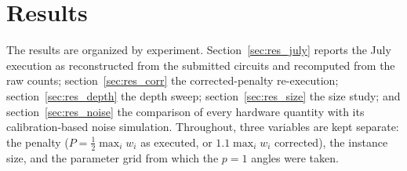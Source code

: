 \documentclass{iopjournal}
\begin{document}
\begin{table}[htbp]
\medskip
{}
\end{table}

\section{Results}
\label{sec:results}


The results are organized by experiment. Section~\ref{sec:res_july} reports the July execution as reconstructed from the submitted circuits and recomputed from the raw counts; section~\ref{sec:res_corr} the corrected-penalty re-execution; section~\ref{sec:res_depth} the depth sweep; section~\ref{sec:res_size} the size study; and section~\ref{sec:res_noise} the comparison of every hardware quantity with its calibration-based noise simulation. Throughout, three variables are kept separate: the penalty ($P = \tfrac{1}{2}\max_i w_i$ as executed, or $1.1\max_i w_i$ corrected), the instance size, and the parameter grid from which the $p=1$ angles were taken.
\end{document}
